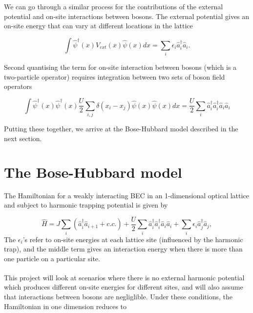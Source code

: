 \documentclass[a4paper,10pt]{article}
\begin{document}
We can go through a similar process for the contributions of the external potential and on-site interactions between bosons. The external potential gives an on-site energy that can vary
at different locations in the lattice

\begin{equation}
 \int  \hat{\psi}^{\dagger}(x) V_{ext}(x)  \hat{\psi}(x)dx = \sum_i \epsilon_i \hat{a}_i^{\dagger}\hat{a}_i.
\end{equation}

Second quantising the term for on-site interaction between bosons (which is a two-particle operator) requires integration between two sets of boson field operators

\begin{equation}
 \int  \hat{\psi}^{\dagger}(x)\hat{\psi}^{\dagger}(x) \frac{U}{2}\sum_{i,j}\delta(x_{i}-x_{j})  \hat{\psi}(x) \hat{\psi}(x) dx = \frac{U}{2}\sum_i \hat{a}_i^{\dagger}\hat{a}_i^{\dagger}\hat{a}_i\hat{a}_i
\end{equation}


Putting these together, we arrive at the Bose-Hubbard model described in the next section.
\newpage




\section{The Bose-Hubbard model}

The Hamiltonian for a weakly interacting BEC in an 1-dimensional optical lattice and subject to harmonic trapping potential is given by

\begin{equation}
 \hat{H}=J\sum_{i}(\hat{a}^\dagger_{i}\hat{a}_{i+1}+c.c.)+\frac{U}{2}\sum_{i}\hat{a}^\dagger_{i}\hat{a}^\dagger_{i}\hat{a}_{i}\hat{a}_{i}+\sum_{i}{\epsilon_i}\hat{a}^\dagger_{j}\hat{a}_{j},
\end{equation}
The $\epsilon_i$'s refer to on-site energies at each lattice site (influenced by the harmonic trap), and the middle term gives an interaction energy when there is more than one particle 
on a particular site.
\\\\
This project will look at scenarios where there is no external harmonic potential which produces different on-site energies for different sites, and will also 
assume that interactions between bosons are negliglible. Under these conditions, the Hamiltonian in one dimension reduces to
\end{document}
